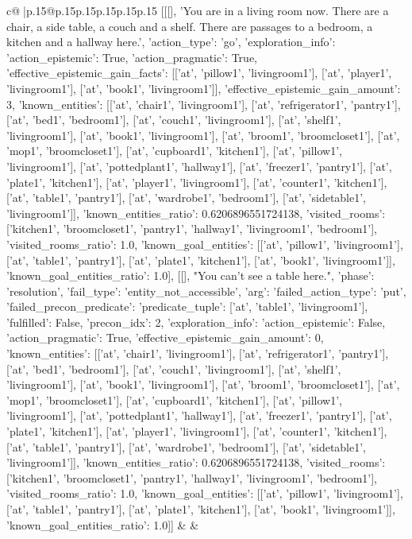 \documentclass{article}
\begin{document}
{\begin{supertabular}{c@{$\;$}|p{.15\linewidth}@{}p{.15\linewidth}p{.15\linewidth}p{.15\linewidth}p{.15\linewidth}p{.15\linewidth}}
{{{	 [[[], 'You are in a living room now. There are a chair, a side table, a couch and a shelf. There are passages to a bedroom, a kitchen and a hallway here.', {'action_type': 'go', 'exploration_info': {'action_epistemic': True, 'action_pragmatic': True, 'effective_epistemic_gain_facts': [['at', 'pillow1', 'livingroom1'], ['at', 'player1', 'livingroom1'], ['at', 'book1', 'livingroom1']], 'effective_epistemic_gain_amount': 3, 'known_entities': [['at', 'chair1', 'livingroom1'], ['at', 'refrigerator1', 'pantry1'], ['at', 'bed1', 'bedroom1'], ['at', 'couch1', 'livingroom1'], ['at', 'shelf1', 'livingroom1'], ['at', 'book1', 'livingroom1'], ['at', 'broom1', 'broomcloset1'], ['at', 'mop1', 'broomcloset1'], ['at', 'cupboard1', 'kitchen1'], ['at', 'pillow1', 'livingroom1'], ['at', 'pottedplant1', 'hallway1'], ['at', 'freezer1', 'pantry1'], ['at', 'plate1', 'kitchen1'], ['at', 'player1', 'livingroom1'], ['at', 'counter1', 'kitchen1'], ['at', 'table1', 'pantry1'], ['at', 'wardrobe1', 'bedroom1'], ['at', 'sidetable1', 'livingroom1']], 'known_entities_ratio': 0.6206896551724138, 'visited_rooms': ['kitchen1', 'broomcloset1', 'pantry1', 'hallway1', 'livingroom1', 'bedroom1'], 'visited_rooms_ratio': 1.0, 'known_goal_entities': [['at', 'pillow1', 'livingroom1'], ['at', 'table1', 'pantry1'], ['at', 'plate1', 'kitchen1'], ['at', 'book1', 'livingroom1']], 'known_goal_entities_ratio': 1.0}}], [[], "You can't see a table here.", {'phase': 'resolution', 'fail_type': 'entity_not_accessible', 'arg': {'failed_action_type': 'put', 'failed_precon_predicate': {'predicate_tuple': ['at', 'table1', 'livingroom1'], 'fulfilled': False, 'precon_idx': 2}}, 'exploration_info': {'action_epistemic': False, 'action_pragmatic': True, 'effective_epistemic_gain_amount': 0, 'known_entities': [['at', 'chair1', 'livingroom1'], ['at', 'refrigerator1', 'pantry1'], ['at', 'bed1', 'bedroom1'], ['at', 'couch1', 'livingroom1'], ['at', 'shelf1', 'livingroom1'], ['at', 'book1', 'livingroom1'], ['at', 'broom1', 'broomcloset1'], ['at', 'mop1', 'broomcloset1'], ['at', 'cupboard1', 'kitchen1'], ['at', 'pillow1', 'livingroom1'], ['at', 'pottedplant1', 'hallway1'], ['at', 'freezer1', 'pantry1'], ['at', 'plate1', 'kitchen1'], ['at', 'player1', 'livingroom1'], ['at', 'counter1', 'kitchen1'], ['at', 'table1', 'pantry1'], ['at', 'wardrobe1', 'bedroom1'], ['at', 'sidetable1', 'livingroom1']], 'known_entities_ratio': 0.6206896551724138, 'visited_rooms': ['kitchen1', 'broomcloset1', 'pantry1', 'hallway1', 'livingroom1', 'bedroom1'], 'visited_rooms_ratio': 1.0, 'known_goal_entities': [['at', 'pillow1', 'livingroom1'], ['at', 'table1', 'pantry1'], ['at', 'plate1', 'kitchen1'], ['at', 'book1', 'livingroom1']], 'known_goal_entities_ratio': 1.0}}]] 
	  } 
	   } 
	   } 
	 & & \\ 
 


\end{supertabular}}
\end{document}
